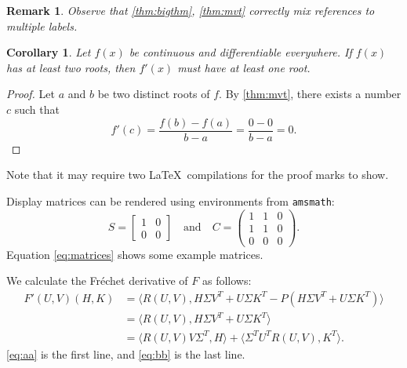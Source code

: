 \documentclass[openany,twoside,12pt]{book}
\theoremstyle{plain}
\newtheorem{corollary}{Corollary}[chapter]
\newtheorem{remark}{Remark}[chapter]
\numberwithin{equation}{chapter}
\numberwithin{figure}{chapter}
\numberwithin{table}{chapter}
\begin{document}
\begin{remark}
Observe that \ref{thm:bigthm}, \ref{thm:mvt} correctly mix references
to multiple labels.
\end{remark}


\begin{corollary}\label{cor:a}
  Let $f(x)$ be continuous and differentiable everywhere. If $f(x)$
  has at least two roots, then $f'(x)$ must have at least one root.
\end{corollary}
\begin{proof}
  Let $a$ and $b$ be two distinct roots of $f$.
  By \ref{thm:mvt}, there exists a number $c$ such that
  \begin{equation*}
    f'(c) = \frac{f(b)-f(a)}{b-a} = \frac{0-0}{b-a} = 0.
  \end{equation*}
\end{proof}

Note that it may require two \LaTeX\ compilations for the proof marks
to show.

Display matrices can be rendered using environments from \texttt{amsmath}:
\begin{equation}\label{eq:matrices}
S=\begin{bmatrix}1&0\\0&0\end{bmatrix}
\quad\text{and}\quad
C=\begin{pmatrix}1&1&0\\1&1&0\\0&0&0\end{pmatrix}.
\end{equation}
Equation \ref{eq:matrices} shows some example matrices.

We calculate the Fr\'{e}chet derivative of $F$ as follows:
\begin{subequations}
\begin{align}
  F'(U,V)(H,K)
  &= \langle R(U,V),H\Sigma V^{T} + U\Sigma K^{T} -
  P(H\Sigma V^{T} + U\Sigma K^{T})\rangle \label{eq:aa} \\
  &= \langle R(U,V),H\Sigma V^{T} + U\Sigma K^{T}\rangle
  \nonumber \\
  &= \langle R(U,V)V\Sigma^{T},H\rangle +
  \langle \Sigma^{T}U^{T}R(U,V),K^{T}\rangle. \label{eq:bb}
\end{align}
\end{subequations}
\ref{eq:aa} is the first line, and \ref{eq:bb} is the last line.
\end{document}

